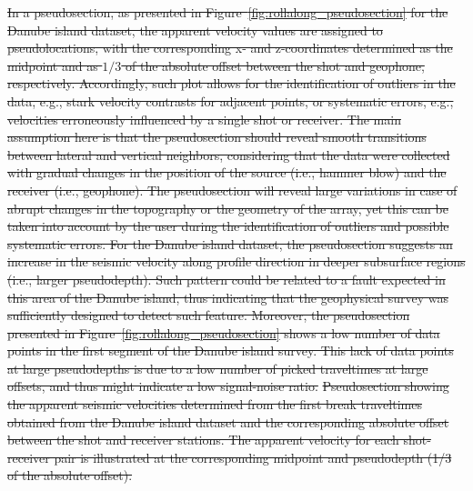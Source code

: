 \documentclass[a4paper,fleqn]{cas-sc}
\providecommand{\DIFdel}[1]{{\protect\color{red}\sout{#1}}}                      %
\providecommand{\DIFdelFL}[1]{\DIFdel{#1}} %
\begin{document}
\DIFdel{In a pseudosection, as presented in Figure~\ref{fig:rollalong_pseudosection} for the Danube island dataset, the apparent velocity values are assigned to pseudolocations, with the corresponding x- and z-coordinates determined as the midpoint and as $1/3$ of the absolute offset between the shot and geophone, respectively.
Accordingly, such plot allows for the identification of outliers in the data, e.g., stark velocity contrasts for adjacent points, or systematic errors, e.g., velocities erroneously influenced by a single shot or receiver. The main assumption here is that the pseudosection should reveal smooth transitions between lateral and vertical neighbors, considering that the data were collected with gradual changes in the position of the source (i.e., hammer blow) and the receiver (i.e., geophone). The pseudosection will reveal large variations in case of abrupt changes in the topography or the geometry of the array, yet this can be taken into account by the user during the identification of outliers and possible systematic errors.
For the Danube island dataset, the pseudosection suggests an increase in the seismic velocity along profile direction in deeper subsurface regions (i.e., larger pseudodepth). Such pattern could be related to a fault expected in this area of the Danube island, thus indicating that the geophysical survey was sufficiently designed to detect such feature.
Moreover, the pseudosection presented in Figure~\ref{fig:rollalong_pseudosection} shows a low number of data points in the first segment of the Danube island survey. This lack of data points at large pseudodepths is due to a low number of picked traveltimes at large offsets, and thus might indicate a low signal-noise ratio.
}%
{%
\DIFdelFL{Pseudosection showing the apparent seismic velocities determined from the first break traveltimes obtained from the Danube island dataset and the corresponding absolute offset between the shot and receiver stations. The apparent velocity for each shot-receiver pair is illustrated at the corresponding midpoint and pseudodepth (1/3 of the absolute offset).}}
\end{document}
